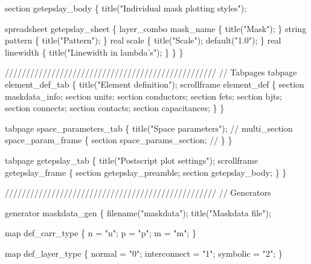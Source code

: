 section getepslay_body \{
    title("Individual mask plotting styles");

    spreadsheet getepslay_sheet \{
        layer_combo mask_name \{ title("Mask"); \}
        string      pattern \{ title("Pattern"); \}
        real        scale \{ title("Scale"); default("1.0"); \}
        real        linewidth \{ title("Linewidth in lambda's"); \}
    \}
\}



//////////////////////////////////////////////////
// Tabpages
tabpage element_def_tab \{
    title("Element definition");
    scrollframe element_def \{
        section maskdata_info;
        section units;
        section conductors;
        section fets;
        section bjts;
        section connects;
        section contacts;
        section capacitances;
    \}
\}

tabpage space_parameters_tab \{
    title("Space parameters");
//    multi_section space_param_frame \{
        section space_params_section;
//    \}
\}

tabpage getepslay_tab \{
    title("Postscript plot settings");
    scrollframe getepslay_frame \{
        section getepslay_preamble;
        section getepslay_body;
    \}
\}

//////////////////////////////////////////////////
// Generators

generator maskdata_gen
\{
    filename("maskdata");
    title("Maskdata file");

    map def_carr_type \{
        n = "n";
        p = "p";
        m = "m";
    \}

    map def_layer_type \{
        normal       = "0";
        interconnect = "1";
        symbolic     = "2";
    \}

